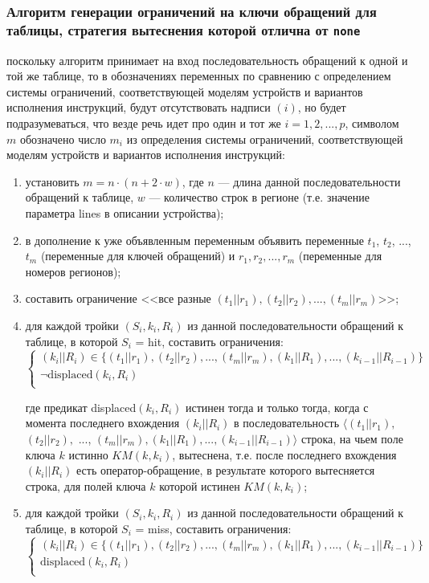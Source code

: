 \subsubsection*{Алгоритм генерации ограничений на ключи обращений для таблицы,
стратегия вытеснения которой отлична от \texttt{none}}
поскольку алгоритм принимает на вход последовательность обращений к одной и той же таблице, то в обозначениях переменных по сравнению с определением системы ограничений, соответствующей моделям устройств и вариантов исполнения инструкций, будут отсутствовать надписи $(i)$, но будет подразумеваться, что везде речь идет про один и тот же $i = 1, 2, ..., p$, символом $m$ обозначено число $m_i$ из определения системы ограничений, соответствующей моделям устройств и вариантов исполнения инструкций: %

\begin{enumerate}
    \item установить $m = n \cdot (n + 2\cdot w)$, где $n$ --- длина данной последовательности обращений к таблице, $w$ --- количество строк в регионе (т.е. значение параметра lines в описании устройства);
    \item в дополнение к уже объявленным переменным объявить переменные $t_1$, $t_2$, ..., $t_m$ (переменные для ключей обращений) и $r_1, r_2, ..., r_m$ (переменные для номеров регионов);
    \item составить ограничение <<все разные $(t_1||r_1), (t_2||r_2), ..., (t_m||r_m)$>>;
    \item для каждой тройки $(S_i, k_i, R_i)$ из данной последовательности обращений к таблице, в которой $S_i$ = hit, составить ограничения:
$$\left\{\begin{array}{l}
    (k_i||R_i) \in \{(t_1||r_1), (t_2||r_2), ..., (t_m||r_m), (k_1||R_1), ..., (k_{i-1}||R_{i-1}) \}\\
    \neg \mbox{displaced}(k_i, R_i)\\
\end{array}\right.$$

где предикат displaced$(k_i, R_i)$ истинен тогда и только тогда, когда с момента последнего вхождения $(k_i||R_i)$ в последовательность $\langle (t_1||r_1),$ $(t_2||r_2),$ ..., $(t_m||r_m), (k_1||R_1), ..., (k_{i-1}||R_{i-1})\rangle$ строка, на чьем поле ключа $k$ истинно $KM(k, k_i)$, вытеснена, т.е. после последнего вхождения $(k_i||R_i)$ есть оператор-обращение, в результате которого вытесняется строка, для полей ключа $k$ которой истинен $KM(k, k_i)$;

    \item для каждой тройки $(S_i, k_i, R_i)$ из данной последовательности обращений к таблице, в которой $S_i$ = miss, составить ограничения:
$$\left\{\begin{array}{l}
    (k_i||R_i) \in \{(t_1||r_1), (t_2||r_2), ..., (t_m||r_m), (k_1||R_1), ...,
(k_{i-1}||R_{i-1}) \}\\
    \mbox{displaced}(k_i, R_i)\\
\end{array}\right.$$


\end{enumerate}
